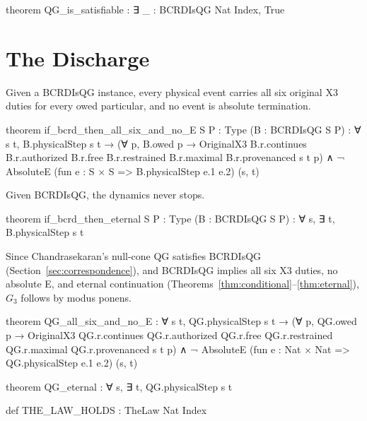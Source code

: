 \begin{leancode}
theorem QG_is_satisfiable : ∃ _ : BCRDIsQG Nat Index, True
\end{leancode}

\section{The Discharge}\label{sec:discharge}

\begin{theorem}\label{thm:conditional}
Given a BCRDIsQG instance, every physical event carries all six original X3 duties for every owed particular, and no event is absolute termination.
\end{theorem}

\begin{leancode}
theorem if_bcrd_then_all_six_and_no_E {S P : Type}
    (B : BCRDIsQG S P) :
    ∀ s t, B.physicalStep s t →
      (∀ p, B.owed p →
        OriginalX3 B.r.continues B.r.authorized B.r.free
          B.r.restrained B.r.maximal B.r.provenanced s t p) ∧
      ¬ AbsoluteE
        (fun e : S × S => B.physicalStep e.1 e.2) (s, t)
\end{leancode}

\begin{theorem}\label{thm:eternal}
Given BCRDIsQG, the dynamics never stops.
\end{theorem}

\begin{leancode}
theorem if_bcrd_then_eternal {S P : Type}
    (B : BCRDIsQG S P) :
    ∀ s, ∃ t, B.physicalStep s t
\end{leancode}

\begin{corollary}\label{cor:g3}
Since Chandrasekaran's null-cone QG satisfies BCRDIsQG (Section~\ref{sec:correspondence}), and BCRDIsQG implies all six X3 duties, no absolute E, and eternal continuation (Theorems~\ref{thm:conditional}--\ref{thm:eternal}), $G_3$ follows by modus ponens.
\end{corollary}

\begin{leancode}
theorem QG_all_six_and_no_E :
    ∀ s t, QG.physicalStep s t →
      (∀ p, QG.owed p →
        OriginalX3 QG.r.continues QG.r.authorized QG.r.free
          QG.r.restrained QG.r.maximal QG.r.provenanced s t p) ∧
      ¬ AbsoluteE
        (fun e : Nat × Nat => QG.physicalStep e.1 e.2) (s, t)

theorem QG_eternal : ∀ s, ∃ t, QG.physicalStep s t

def THE_LAW_HOLDS : TheLaw Nat Index
\end{leancode}

